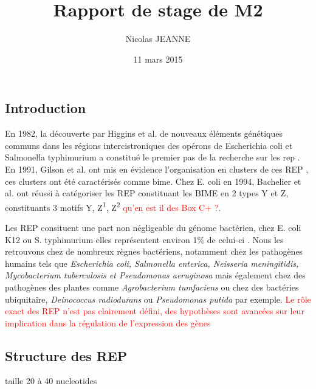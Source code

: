 \documentclass[12pt,a4paper]{report}
\author{Nicolas JEANNE}
\title{Rapport de stage de M2}
\date{11 mars 2015}
\begin{document}
\maketitle

\begin{doublespace}
\chapter*{Introduction}
En 1982, la découverte par Higgins et al. de nouveaux éléments génétiques communs dans les régions intercistroniques des opérons de Escherichia coli et Salmonella typhimurium a constitué le premier pas de la recherche sur les \gls{rep} \citep{Higgins1982}. En 1991, Gilson et al. ont mis en évidence l'organisation en clusters de ces REP \citep{Gilson1991}, ces clusters ont été caractérisés comme \gls{bime}. Chez E. coli en 1994, Bachelier et al. ont réussi à catégoriser les REP constituant les BIME en 2 types Y et Z, constituants 3 motifs Y, Z\textsuperscript{1}, Z\textsuperscript{2} \textcolor{red}{qu'en est il des Box C+ ?}\citep{Bachellier1994}.
 
Les REP consituent une part non négligeable du génome bactérien, chez E. coli K12 ou S. typhimurium elles représentent environ 1\% de celui-ci \citep{Gilson1991}. Nous les retrouvons chez de nombreux règnes bactériens, notamment chez les pathogènes humains tels que \textit{Escherichia coli, Salmonella enterica, Neisseria meningitidis, Mycobacterium tuberculosis et Pseudomonas aeruginosa} mais également chez des pathogènes des plantes comme \textit{Agrobacterium tumfaciens} ou chez des bactéries ubiquitaire, \textit{Deinococcus radiodurans} ou \textit{Pseudomonas putida} par exemple. \textcolor{red}{Le rôle exact des REP n'est pas clairement défini, des hypothèses sont avancées sur leur implication dans la régulation de l'expression des gènes}

\section*{Structure des REP}
taille 20 à 40 nucleotides

\end{doublespace} 
\printglossary[type=\acronymtype ,title=Glossaire]



\end{document}
